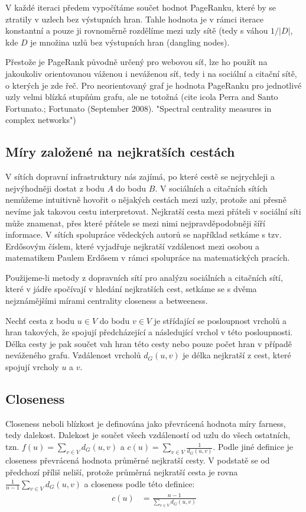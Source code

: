 \documentclass[12pt,titlepage]{report}
\begin{document}
V každé iteraci předem vypočítáme součet hodnot PageRanku, které by se ztratily
v uzlech bez výstupních hran. Tahle hodnota je v rámci iterace konstantní a
pouze ji rovnoměrně rozdělíme mezi uzly sítě (tedy s váhou $1/|D|$, kde $D$ je
množina uzlů bez výstupních hran (dangling nodes).

Přestože je PageRank původně určený pro webovou síť, lze ho použít na
jakoukoliv orientovanou váženou i neváženou síť, tedy i na sociální a citační
sítě, o kterých je zde řeč. Pro neorientovaný graf je hodnota PageRanku pro
jednotlivé uzly velmi blízká stupňům grafu, ale ne totožná (cite icola Perra
and Santo Fortunato.; Fortunato (September 2008). "Spectral centrality measures
in complex networks")

\subsection{Míry založené na nejkratších cestách}
V sítích dopravní infrastruktury nás zajímá, po které cestě se nejrychleji a
nejvýhodněji dostat z bodu $A$ do bodu $B$. V sociálních a citačních sítích
nemůžeme intuitivně hovořit o nějakých cestách mezi uzly, protože ani přesně
nevíme jak takovou cestu interpretovat. Nejkratší cesta mezi přáteli v sociální
síti může znamenat, přes které přátele se mezi nimi nejpravděpodobněji šíří
informace. V sítích spolupráce vědeckých autorů se například setkáme s tzv.
Erdősovým číslem, které vyjadřuje nejkratší vzdálenost mezi osobou a
matematikem Paulem Erdősem v rámci spolupráce na matematických pracích.

Použijeme-li metody z dopravních sítí pro analýzu sociálních a citačních sítí,
které v jádře spočívají v hledání nejkratších cest, setkáme se s dvěma
nejznámějšími mírami centrality closeness a betweeness.

Nechť cesta z bodu $u \in V$ do bodu $v \in V$ je střídající se posloupnost
vrcholů a hran takových, že spojují předcházející a následující vrchol v této
posloupnosti. Délka cesty je pak součet vah hran této cesty nebo pouze počet
hran v případě neváženého grafu. Vzdálenost vrcholů $d_G(u, v)$ je délka
nejkratší z cest, které spojují vrcholy $u$ a $v$.

\subsection{Closeness}
Closeness neboli blízkost je definována jako převrácená hodnota míry farness,
tedy dalekost. Dalekost je součet všech vzdáleností od uzlu do všech ostatních,
tzn. $f(u) = \sum_{v \in V} d_G(u, v)$ a $c(u) = \sum_{v \in V} \frac{1}{d_G(u,
v)}$. Podle jiné definice je closeness převrácená hodnota průměrné nejkratší
cesty. V podstatě se od předchozí příliš neliší, protože průměrná nejkratší
cesta je rovna $\frac{1}{n
- 1} \sum_{v \in V} d_G(u, v)$ a closeness podle této definice:
\begin{align*}
c(u) &= \frac{n - 1}{\sum_{v \in V} d_G(u, v)}
\end{align*}
\end{document}
